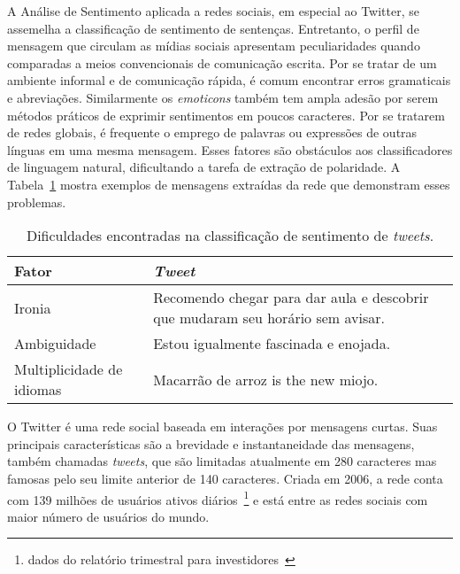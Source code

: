A Análise de Sentimento aplicada a redes sociais, em especial ao Twitter, se
assemelha a classificação de sentimento de sentenças.
Entretanto, o perfil de mensagem que circulam as mídias sociais apresentam
peculiaridades quando comparadas a meios convencionais de comunicação escrita.
Por se tratar de um ambiente informal e de comunicação rápida, é comum encontrar
erros gramaticais e abreviações.
Similarmente os \textit{emoticons} também tem ampla adesão por serem métodos
práticos de exprimir sentimentos em poucos caracteres.
Por se tratarem de redes globais, é frequente o emprego de palavras ou
expressões de outras línguas em uma mesma mensagem.
Esses fatores são obstáculos aos classificadores de linguagem natural,
dificultando a tarefa de extração de polaridade.
A Tabela~\ref{tab:sentiment_complexity} mostra exemplos de mensagens extraídas
da rede que demonstram esses problemas.

\begin{table}[h]
    \begin{center}
        \begin{tabular}{| l | p{10cm} |}
        \hline
        \textbf{Fator} & \textbf{\textit{Tweet}} \\ \hline
        Ironia & Recomendo chegar para dar aula e descobrir que mudaram seu horário sem avisar. \\ \hline
        Ambiguidade & Estou igualmente fascinada e enojada. \\ \hline
        Multiplicidade de idiomas & Macarrão de arroz is the new miojo. \\ \hline
        \end{tabular}
        \caption{Dificuldades encontradas na classificação de sentimento de
                 \textit{tweets}.}
        \label{tab:sentiment_complexity}
    \end{center}
\end{table}

O Twitter é uma rede social baseada em interações por mensagens curtas.
Suas principais características são a brevidade e instantaneidade das mensagens,
também chamadas \textit{tweets}, que são limitadas atualmente em 280 caracteres
mas famosas pelo seu limite anterior de 140 caracteres.
Criada em 2006, a rede conta com 139 milhões de usuários ativos
diários~\footnote{dados do relatório trimestral para
investidores~\cite{twitterreport19}} e está entre
as redes sociais com maior número de usuários do mundo.

